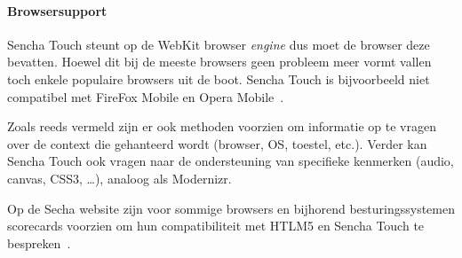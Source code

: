 \documentclass[a4paper]{article}
\newcommand{\term}[1]{\emph{#1}}
\newcommand{\code}[1]{\texttt{#1}}
\begin{document}
% 
% 

\paragraph{Browsersupport}
Sencha Touch steunt op de WebKit browser \term{engine} dus moet de browser deze bevatten.  Hoewel dit bij de meeste browsers geen probleem meer vormt vallen toch enkele populaire browsers uit de boot.  Sencha Touch is bijvoorbeeld niet compatibel met FireFox Mobile en Opera Mobile~\cite{JohnEClark2012}.

Zoals reeds vermeld zijn er ook methoden voorzien om informatie op te vragen over de context die gehanteerd wordt (browser, OS, toestel, etc.).  Verder kan Sencha Touch ook vragen naar de ondersteuning van specifieke kenmerken (audio,  canvas,  CSS3, …),  analoog als Modernizr.  

Op de Secha website zijn voor sommige browsers en bijhorend besturingssystemen scorecards voorzien om hun compatibiliteit met HTLM5 en Sencha Touch te bespreken~\cite{Inc.}.
\end{document}
